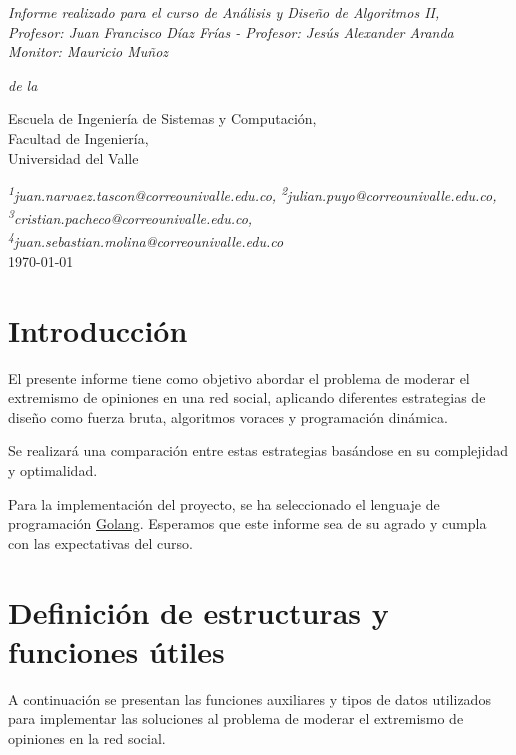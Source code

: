 \documentclass[letterpaper,10pt]{article}
\begin{document}
\begin{titlepage}
\begin{center}
    \vspace{2cm}
    
    \large \textit{
    Informe realizado para el curso de Análisis y Diseño de Algoritmos II,\\
    Profesor: Juan Francisco Díaz Frías - Profesor: Jesús Alexander Aranda\\
    Monitor: Mauricio Muñoz} 
    
    \vspace{0.3cm} %
    
    \textit{de la}
    
    \vspace{0.4cm}
    
    Escuela de Ingeniería de Sistemas y Computación,\\ 
    Facultad de Ingeniería,\\ 
    Universidad del Valle
    
    \vspace{1.0cm} 
    {\color{crtitle} \small \textit{  
        \textsuperscript{1}juan.narvaez.tascon@correounivalle.edu.co, 
        \textsuperscript{2}julian.puyo@correounivalle.edu.co, 
        \textsuperscript{3}cristian.pacheco@correounivalle.edu.co,
        \textsuperscript{4}juan.sebastian.molina@correounivalle.edu.co
    }}\\
    \today
     
    
    \end{center}
    \end{titlepage}
\newpage

\tableofcontents
\newpage
\section{Introducción}
\label{sec:introduccion}
El presente informe tiene como objetivo abordar el problema de moderar el extremismo de opiniones en una red social, aplicando diferentes estrategias de diseño como fuerza bruta, algoritmos voraces y programación dinámica.

Se realizará una comparación entre estas estrategias basándose en su complejidad y optimalidad.

Para la implementación del proyecto, se ha seleccionado el lenguaje de programación \href{https://go.dev/}{Golang}. Esperamos que este informe sea de su agrado y cumpla con las expectativas del curso.
\section{Definición de estructuras y funciones útiles}
A continuación se presentan las funciones auxiliares y tipos de datos utilizados para implementar las soluciones al problema de moderar el extremismo de opiniones en la red social.
\end{document}
